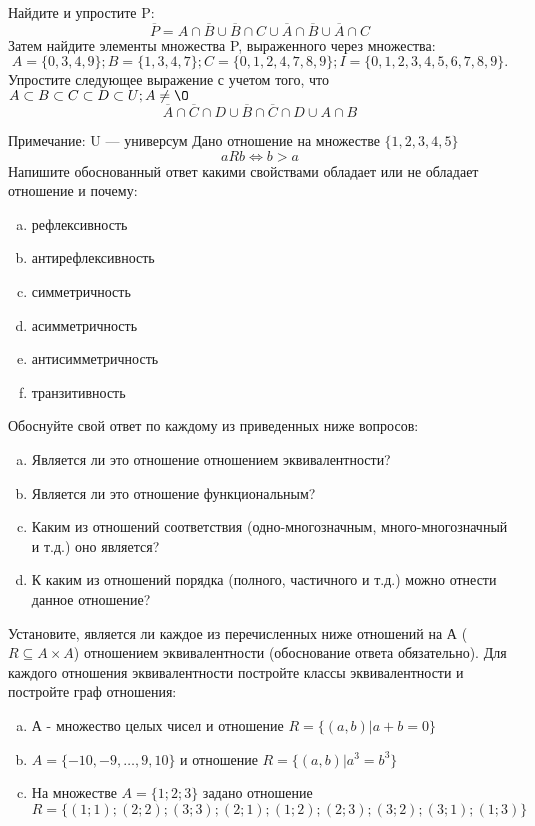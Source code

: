 \documentclass[10pt]{exam}
\begin{document}
\begin{questions}
\question
Найдите и упростите P:
\begin{equation*}
\overline{P} = A \cap \overline{B} \cup \overline{B} \cap C \cup \overline{A} \cap \overline{B} \cup \overline{A} \cap C
\end{equation*}
Затем найдите элементы множества P, выраженного через множества:
\begin{equation*}
A = \{0, 3, 4, 9\}; 
B = \{1, 3, 4, 7\};
C = \{0, 1, 2, 4, 7, 8, 9\};
I = \{0, 1, 2, 3, 4, 5, 6, 7, 8, 9\}.
\end{equation*}\question
Упростите следующее выражение с учетом того, что $A\subset B \subset C \subset D \subset U; A \neq \O$
\begin{equation*}
\overline{A} \cap \overline{C} \cap D \cup \overline{B} \cap \overline{C} \cap D \cup A \cap B
\end{equation*}

Примечание: U — универсум\question
Дано отношение на множестве $\{1, 2, 3, 4, 5\}$ 
\begin{equation*}
aRb \iff b > a
\end{equation*}
Напишите обоснованный ответ какими свойствами обладает или не обладает отношение и почему:   
\begin{enumerate} [a)]\setcounter{enumi}{0}
\item рефлексивность
\item антирефлексивность
\item симметричность
\item асимметричность
\item антисимметричность
\item транзитивность
\end{enumerate}

Обоснуйте свой ответ по каждому из приведенных ниже вопросов:
\begin{enumerate} [a)]\setcounter{enumi}{0}
    \item Является ли это отношение отношением эквивалентности?
    \item Является ли это отношение функциональным?
    \item Каким из отношений соответствия (одно-многозначным, много-многозначный и т.д.) оно является?
    \item К каким из отношений порядка (полного, частичного и т.д.) можно отнести данное отношение?
\end{enumerate}

\question
Установите, является ли каждое из перечисленных ниже отношений на А ($R \subseteq A \times A$) отношением эквивалентности (обоснование ответа обязательно). Для каждого отношения эквивалентности 
постройте классы эквивалентности и постройте граф отношения:
\begin{enumerate}[a)]\setcounter{enumi}{0}
\item А - множество целых чисел и отношение $R = \{(a,b)|a + b = 0\}$
\item $A = \{-10, -9, …, 9, 10\}$ и отношение $R = \{(a,b)|a^{3} = b^{3}\}$
\item На множестве $A = \{1; 2; 3\}$ задано отношение $R = \{(1; 1); (2; 2); (3; 3); (2; 1); (1; 2); (2; 3); (3; 2); (3; 1); (1; 3)\}$


\end{enumerate}
\end{questions}
\end{document}
